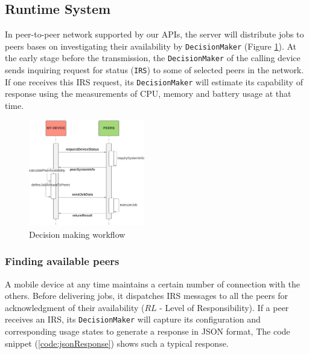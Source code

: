 \documentclass[conference]{IEEEtran}
\begin{document}
\subsection{Runtime System} \label{scheduling}

In peer-to-peer network supported by our APIs, the server will distribute jobs to peers bases on investigating their availability by \texttt{DecisionMaker} (Figure \ref{fig:checkStatus}). At the early stage before the transmission, the \texttt{DecisionMaker} of the calling device sends inquiring request for status (\texttt{IRS}) to some of selected peers in the network. If one receives this IRS request, its \texttt{DecisionMaker} will estimate its capability of response using the measurements of CPU, memory and battery usage at that time. 

\begin{figure}[H]
\centerline {
\includegraphics[width=0.45\textwidth, natwidth=915, natheight=837]{data/checkStatusFlow}
}
\caption{Decision making workflow}
\label{fig:checkStatus}
\end{figure}

\subsubsection{Finding available peers}\label{ss_dfp}

A mobile device at any time maintains a certain number of connection with the others. Before delivering jobs, it dispatches IRS messages to all the peers for acknowledgment of their availability ($RL$ - Level of Responsibility). If a peer receives an IRS, its \texttt{DecisionMaker} will capture its configuration and corresponding usage states to generate a response in JSON format, The code snippet (\ref{code:jsonResponse}) shows such a typical response.\\
\end{document}
